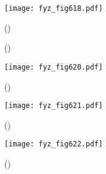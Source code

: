     \begin{figure}[ht!] %
      \centering
      \texttt{[image: fyz\_fig618.pdf]}
      \caption{
               (\cite[s.~707]{Feynman02})}
      \label{fyz:fig618}
    \end{figure}

    \begin{figure}[ht!]
      \centering
      \label{fyz:fig619}
      \caption{
               (\cite[s.~748]{Feynman02})}
    \end{figure}

    \begin{figure}[ht!] %
      \centering
      \texttt{[image: fyz\_fig620.pdf]}
      \caption{
               (\cite[s.~707]{Feynman02})}
      \label{fyz:fig620}
    \end{figure}

    \begin{figure}[ht!] %
      \centering
      \texttt{[image: fyz\_fig621.pdf]}
      \caption{
               (\cite[s.~707]{Feynman02})}
      \label{fyz:fig621}
    \end{figure}

    \begin{figure}[ht!] %
      \centering
      \texttt{[image: fyz\_fig622.pdf]}
      \caption{
               (\cite[s.~707]{Feynman02})}
      \label{fyz:fig622}
    \end{figure}

